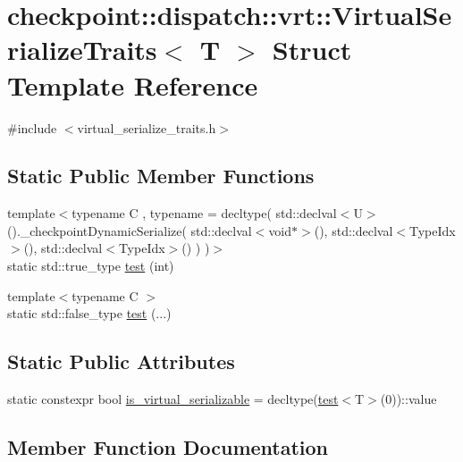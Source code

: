 \hypertarget{structcheckpoint_1_1dispatch_1_1vrt_1_1_virtual_serialize_traits}{}\section{checkpoint\+:\+:dispatch\+:\+:vrt\+:\+:Virtual\+Serialize\+Traits$<$ T $>$ Struct Template Reference}
\label{structcheckpoint_1_1dispatch_1_1vrt_1_1_virtual_serialize_traits}


{\ttfamily \#include $<$virtual\+\_\+serialize\+\_\+traits.\+h$>$}

\subsection*{Static Public Member Functions}
\begin{DoxyCompactItemize}
\item 
{\footnotesize template$<$typename C , typename  = decltype(      std\+::declval$<$\+U$>$().\+\_\+checkpoint\+Dynamic\+Serialize(        std\+::declval$<$void$\ast$$>$(),        std\+::declval$<$\+Type\+Idx$>$(),        std\+::declval$<$\+Type\+Idx$>$()      )    )$>$ }\\static std\+::true\+\_\+type \hyperlink{structcheckpoint_1_1dispatch_1_1vrt_1_1_virtual_serialize_traits_a31d0ba739deb9cac3010c076666f4099}{test} (int)
\item 
{\footnotesize template$<$typename C $>$ }\\static std\+::false\+\_\+type \hyperlink{structcheckpoint_1_1dispatch_1_1vrt_1_1_virtual_serialize_traits_aa60ab3d3a5bdc4e36497b47dc35aae04}{test} (...)
\end{DoxyCompactItemize}
\subsection*{Static Public Attributes}
\begin{DoxyCompactItemize}
\item 
static constexpr bool \hyperlink{structcheckpoint_1_1dispatch_1_1vrt_1_1_virtual_serialize_traits_a93d9ad95dbb6a0b00982a7f2cc2d54b7}{is\+\_\+virtual\+\_\+serializable} = decltype(\hyperlink{structcheckpoint_1_1dispatch_1_1vrt_1_1_virtual_serialize_traits_a31d0ba739deb9cac3010c076666f4099}{test}$<$T$>$(0))\+::value
\end{DoxyCompactItemize}


\subsection{Member Function Documentation}
\mbox{\label{structcheckpoint_1_1dispatch_1_1vrt_1_1_virtual_serialize_traits_a31d0ba739deb9cac3010c076666f4099}} 
